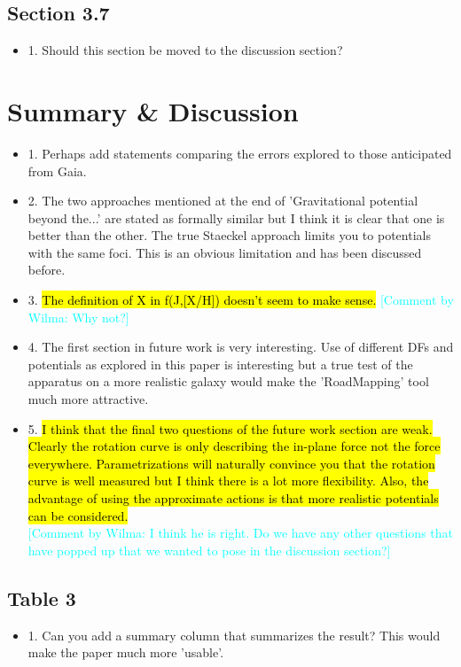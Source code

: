 \documentclass[10pt,a4paper]{article}
\newcommand{\HW}[1]{\textcolor{Cyan}{#1}}
\begin{document}
\subsection{Section 3.7}
\begin{itemize}
\item 1. Should this section be moved to the discussion section?
\end{itemize}

\section{Summary \& Discussion}
\begin{itemize}
\item 1. Perhaps add statements comparing the errors explored to those anticipated from Gaia.
\item 2. The two approaches mentioned at the end of 'Gravitational potential beyond the...' are stated as formally similar but I think it is clear that one is better than the other. The true Staeckel approach limits you to potentials with the same foci. This is an obvious limitation and has been discussed before.
\item 3. \hl{The definition of X in f(J,[X/H]) doesn't seem to make sense.} \HW{[Comment by Wilma: Why not?]}
\item 4. The first section in future work is very interesting. Use of different DFs and potentials as explored in this paper is interesting but a true test of the apparatus on a more realistic galaxy would make the 'RoadMapping' tool much more attractive.
\item 5. \hl{I think that the final two questions of the future work section are weak. Clearly the rotation curve is only describing the in-plane force not the force everywhere. Parametrizations will naturally convince you that the rotation curve is well measured but I think there is a lot more flexibility. Also, the advantage of using the approximate actions is that more realistic potentials can be considered.} \\\HW{[Comment by Wilma: I think he is right. Do we have any other questions that have popped up that we wanted to pose in the discussion section?]}
\end{itemize}

\subsection{Table 3}
\begin{itemize}
\item 1. Can you add a summary column that summarizes the result? This would make the paper much more 'usable'.
\end{itemize}
\end{document}

